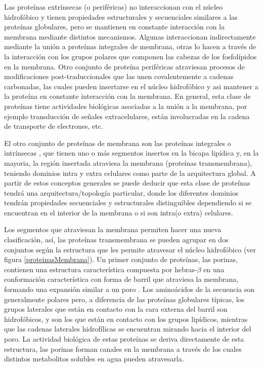Las proteínas extrínsecas (o periféricas) no interaccionan con el núcleo hidrofóbico y tienen propiedades estructurales y secuenciales similares a las proteínas globulares, 
pero se mantienen en constante interacción con la membrana mediante distintos mecanismos.
Algunas interaccionan indirectamente mediante la unión a proteínas integrales de membrana, otras lo hacen a través de la interacción con los grupos polares que componen las cabezas de los fosfolípidos en la membrana. 
Otro conjunto de proteína periféricas atraviesan procesos de modificaciones post-traduccionales que las unen covalentemente a cadenas carbonadas, las cuales pueden insertarse en el núcleo hidrofóbico y
asi mantener a la proteína en constante interacción con la membrana.
En general, esta clase de proteínas tiene actividades biológicas asociadas a la unión a la membrana, por ejemplo transducción de señales extracelulares, están involucradas en la cadena de transporte de electrones, etc.

El otro conjunto de proteínas de membrana son las proteínas integrales o intrínsecas \cite{heijne1994membrane}, que tienen uno o más segmentos insertos en la bicapa lipídica y, en la mayoria, 
la región insertada atraviesa la membrana (proteínas transmembrana), teniendo dominios intra y extra celulares como parte de la arquitectura global.
A partir de estos conceptos generales se puede deducir que esta clase de proteínas tendrá una arquitectura/topología particular, 
donde los diferentes dominios tendrán propiedades secuenciales y estructurales distinguibles dependiendo si se encuentran en el interior de la membrana o si son intra(o extra) celulares. 

Los segmentos que atraviesan la membrana permiten hacer una nueva clasificación, así, las proteínas transmembrana se pueden agrupar 
en dos conjuntos según la estructura que les permite atravesar el núcleo hidrofóbico (ver figura \ref{proteinasMembrana}).
Un primer conjunto de proteínas, las porinas, contienen una estructura característica compuesta por hebras-$\beta$ en una conformación característica con forma de barril que atraviesa la membrana, formando una expansión similar a un poro \cite{weiss1991molecular}.
Los aminoácidos de la secuencia son generalmente polares pero, a diferencia de las proteínas globulares típicas, los grupos laterales que están en contacto con la cara externa del barril son hidrofóbicos, y son los que están en contacto con 
los grupos lipídicos, mientras que las cadenas laterales hidrofílicas se encuentran mirando hacia el interior del poro.
La actividad biológica de estas proteínas se deriva directamente de esta estructura, las porinas forman canales en la membrana a través de los cuales distintos metabolitos solubles en agua pueden atravesarla. 

